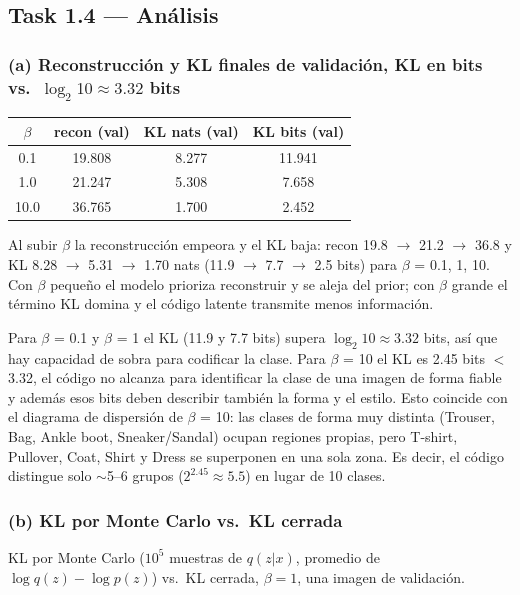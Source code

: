 \documentclass[11pt]{article}
\begin{document}
\subsection*{Task 1.4 --- Análisis}

\subsubsection*{(a) Reconstrucción y KL finales de validación, KL en bits vs.\ $\log_2 10\approx3.32$ bits}
\begin{table}[H]
\centering
\begin{tabular}{cccc}
\toprule
$\beta$ & recon (val) & KL nats (val) & KL bits (val) \\
\midrule
0.1 & 19.808 & 8.277 & 11.941 \\
1.0 & 21.247 & 5.308 & 7.658 \\
10.0 & 36.765 & 1.700 & 2.452 \\
\bottomrule
\end{tabular}
\end{table}

Al subir $\beta$ la reconstrucción empeora y el KL baja: recon 19.8 $\rightarrow$ 21.2 $\rightarrow$ 36.8 y KL 8.28 $\rightarrow$ 5.31 $\rightarrow$ 1.70 nats (11.9 $\rightarrow$ 7.7 $\rightarrow$ 2.5 bits) para $\beta$ = 0.1, 1, 10. Con $\beta$ pequeño el modelo prioriza reconstruir y se aleja del prior; con $\beta$ grande el término KL domina y el código latente transmite menos información.

Para $\beta$ = 0.1 y $\beta$ = 1 el KL (11.9 y 7.7 bits) supera $\log_2 10 \approx 3.32$ bits, así que hay capacidad de sobra para codificar la clase. Para $\beta$ = 10 el KL es 2.45 bits $<$ 3.32, el código no alcanza para identificar la clase de una imagen de forma fiable y además esos bits deben describir también la forma y el estilo. Esto coincide con el diagrama de dispersión de $\beta$ = 10: las clases de forma muy distinta (Trouser, Bag, Ankle boot, Sneaker/Sandal) ocupan regiones propias, pero T-shirt, Pullover, Coat, Shirt y Dress se superponen en una sola zona. Es decir, el código distingue solo $\sim$5--6 grupos ($2^{2.45} \approx 5.5$) en lugar de 10 clases.

\subsubsection*{(b) KL por Monte Carlo vs.\ KL cerrada}
KL por Monte Carlo ($10^5$ muestras de $q(z|x)$, promedio de $\log q(z)-\log p(z)$) vs.\ KL cerrada, $\beta=1$, una imagen de validación.
\end{document}
